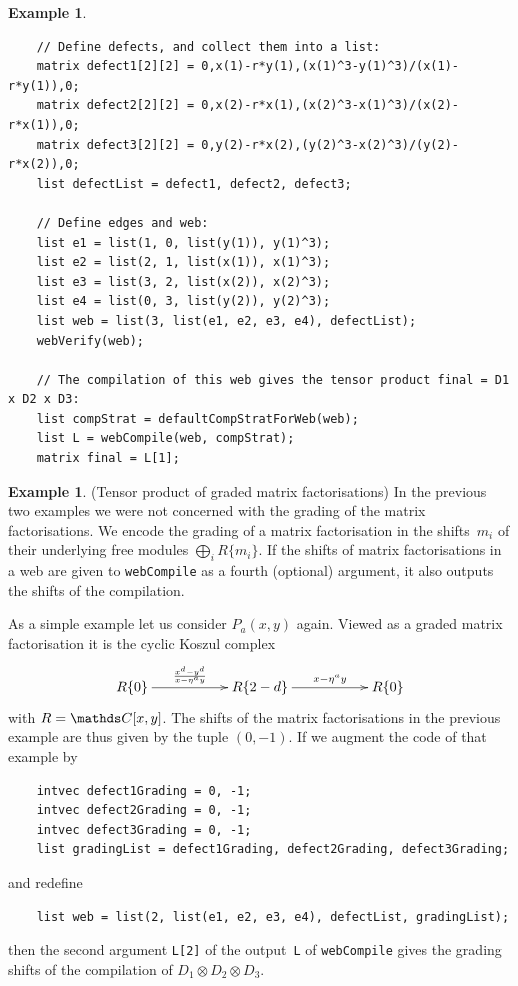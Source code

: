\documentclass{compositio}
\theoremstyle{definition}
\newtheorem{example}[theorem]{Example}
\numberwithin{equation}{section}
\begin{document}
\begin{example}
{\begin{verbatim}
    // Define defects, and collect them into a list:
    matrix defect1[2][2] = 0,x(1)-r*y(1),(x(1)^3-y(1)^3)/(x(1)-r*y(1)),0;
    matrix defect2[2][2] = 0,x(2)-r*x(1),(x(2)^3-x(1)^3)/(x(2)-r*x(1)),0;
    matrix defect3[2][2] = 0,y(2)-r*x(2),(y(2)^3-x(2)^3)/(y(2)-r*x(2)),0;
    list defectList = defect1, defect2, defect3;
    
    // Define edges and web:
    list e1 = list(1, 0, list(y(1)), y(1)^3);
    list e2 = list(2, 1, list(x(1)), x(1)^3);
    list e3 = list(3, 2, list(x(2)), x(2)^3);
    list e4 = list(0, 3, list(y(2)), y(2)^3);
    list web = list(3, list(e1, e2, e3, e4), defectList);
    webVerify(web);
    
    // The compilation of this web gives the tensor product final = D1 x D2 x D3:
    list compStrat = defaultCompStratForWeb(web);
    list L = webCompile(web, compStrat);
    matrix final = L[1];
\end{verbatim}
}
\end{example}


\begin{example}(Tensor product of graded matrix factorisations) 
In the previous two examples we were not concerned with the grading of the matrix factorisations. We encode the grading of a matrix factorisation in the shifts~$m_{i}$ of their underlying free modules $\bigoplus_{i}R\{m_{i}\}$. If the shifts of matrix factorisations in a web are given to \texttt{webCompile} as a fourth (optional) argument, it also outputs the shifts of the compilation. 

As a simple example let us consider $P_{a}(x,y)$ again. Viewed as a graded matrix factorisation it is the cyclic Koszul complex
$$
\xymatrix{%
R\{0\} \ar[rr]^-{\frac{x^d-y^d}{x-\eta^{a}y}} && R\{2-d\}  \ar[rr]^-{x-\eta^{a}y} && R\{0\}
}
$$
with $R=\nC[x,y]$. The shifts of the matrix factorisations in the previous example are thus given by the tuple $(0,-1)$. If we augment the code of that example by
{\footnotesize
\begin{verbatim}
    intvec defect1Grading = 0, -1;
    intvec defect2Grading = 0, -1;
    intvec defect3Grading = 0, -1;
    list gradingList = defect1Grading, defect2Grading, defect3Grading;
\end{verbatim}
}
\noindent and redefine
{\footnotesize
\begin{verbatim}
    list web = list(2, list(e1, e2, e3, e4), defectList, gradingList);
\end{verbatim}
}
\noindent then the second argument \texttt{L[2]} of the output~\texttt{L} of \texttt{webCompile} gives the grading shifts of the compilation of $D_{1}\otimes D_{2}\otimes D_{3}$. 
\end{example}
\end{document}
